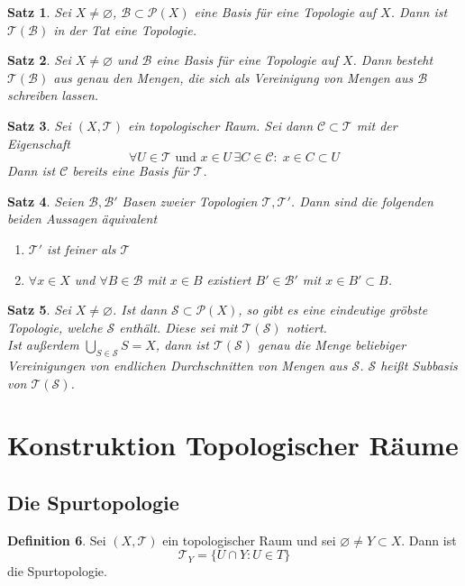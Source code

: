 \documentclass[a4paper, 12pt]{article}
\theoremstyle{plain}
\newtheorem{theorem}{Satz}[section] %
\theoremstyle{definition}
\newtheorem{definition}[theorem]{Definition} %
\theoremstyle{lemma}
\theoremstyle{remark}
\theoremstyle{corollary}
\theoremstyle{example}
\begin{document}
	\begin{theorem}
		Sei $X \neq \varnothing$, $\mathcal{B} \subset \mathcal{P}(X)$ eine Basis für eine Topologie auf $X$. Dann ist $\mathcal{T}(\mathcal{B})$ in der Tat eine Topologie.
	\end{theorem}
	\begin{theorem}
		Sei $X \neq \varnothing$ und $\mathcal{B}$ eine Basis für eine Topologie auf $X$. Dann besteht $\mathcal{T}(\mathcal{B})$ aus genau den Mengen, die sich als Vereinigung von Mengen aus $\mathcal{B}$ schreiben lassen.
	\end{theorem}
	\begin{theorem}
		Sei $(X,\mathcal{T})$ ein topologischer Raum. Sei dann $\mathcal{C} \subset \mathcal{T}$ mit der Eigenschaft \[\forall U \in \mathcal{T} \text{ und } x \in U \, \exists C \in \mathcal{C}: \; x \in C \subset U\]
		Dann ist $\mathcal{C}$ bereits eine Basis für $\mathcal{T}$.
	\end{theorem}
	\begin{theorem}
		Seien $\mathcal{B}, \mathcal{B}'$ Basen zweier Topologien $\mathcal{T}, \mathcal{T}'$. Dann sind die folgenden beiden Aussagen äquivalent \begin{enumerate}
			\item $\mathcal{T}'$ ist feiner als $\mathcal{T}$
			\item $\forall x \in X$ und $\forall B \in \mathcal{B}$ mit $x\in B$ existiert $B'\in \mathcal{B}'$ mit $x\in B' \subset B$.
		\end{enumerate}
	\end{theorem}
	\begin{theorem}
		Sei $X \neq \varnothing$. Ist dann $\mathcal{S}\subset \mathcal{P}(X)$, so gibt es eine eindeutige gröbste Topologie, welche $\mathcal{S}$ enthält. Diese sei mit $\mathcal{T}(\mathcal{S})$ notiert.\\
		Ist außerdem $\bigcup_{S \in \mathcal{S}} S = X$, dann ist $\mathcal{T}(\mathcal{S})$ genau die Menge beliebiger Vereinigungen von endlichen Durchschnitten von Mengen aus $\mathcal{S}$. $\mathcal{S}$ heißt Subbasis von $\mathcal{T}(\mathcal{S})$.
	\end{theorem}
	\section{Konstruktion Topologischer Räume}
	\subsection{Die Spurtopologie}
	\begin{definition}
		Sei $(X,\mathcal{T})$ ein topologischer Raum und sei $\varnothing \neq Y \subset X$. Dann ist \[\mathcal{T}_Y = \{U \cap Y: U \in T\}\] die Spurtopologie.
	\end{definition}
\end{document}
